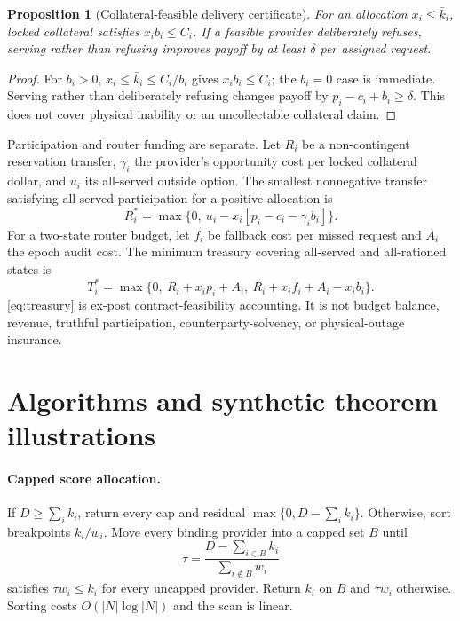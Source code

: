 \documentclass[11pt]{article}
\newtheorem{proposition}{Proposition}
\theoremstyle{definition}
\begin{document}
\begin{proposition}[Collateral-feasible delivery certificate]
\label{prop:collateral}
For an allocation $x_i\leq\bar k_i$, locked collateral satisfies
$x_i b_i\leq C_i$. If a feasible provider deliberately refuses, serving rather
than refusing improves payoff by at least $\delta$ per assigned request.
\end{proposition}

\begin{proof}
For $b_i>0$, $x_i\leq\bar k_i\leq C_i/b_i$ gives $x_ib_i\leq C_i$; the
$b_i=0$ case is immediate. Serving rather than deliberately refusing changes
payoff by $p_i-c_i+b_i\geq\delta$. This does not cover physical inability or an
uncollectable collateral claim.
\end{proof}

Participation and router funding are separate. Let $R_i$ be a non-contingent
reservation transfer, $\gamma_i$ the provider's opportunity cost per locked
collateral dollar, and $u_i$ its all-served outside option. The smallest
nonnegative transfer satisfying all-served participation for a positive
allocation is
\[
 R_i^*=\max\{0,\ u_i-x_i[p_i-c_i-\gamma_i b_i]\}.
\]
For a two-state router budget, let $f_i$ be fallback cost per missed request
and $A_i$ the epoch audit cost. The minimum treasury covering all-served and
all-rationed states is
\begin{equation}
\label{eq:treasury}
 T_i^*=\max\{0,\ R_i+x_ip_i+A_i,\ R_i+x_if_i+A_i-x_ib_i\}.
\end{equation}
\cref{eq:treasury} is ex-post contract-feasibility accounting. It is not
budget balance, revenue, truthful participation, counterparty-solvency, or
physical-outage insurance.

\section{Algorithms and synthetic theorem illustrations}
\label{sec:algorithms}

\paragraph{Capped score allocation.}
If $D\geq\sum_i k_i$, return every cap and residual
$\max\{0,D-\sum_i k_i\}$. Otherwise, sort breakpoints $k_i/w_i$. Move every
binding provider into a capped set $B$ until
\[
 \tau=\frac{D-\sum_{i\in B}k_i}{\sum_{i\notin B}w_i}
\]
satisfies $\tau w_i\leq k_i$ for every uncapped provider. Return $k_i$ on
$B$ and $\tau w_i$ otherwise. Sorting costs $O(|N|\log |N|)$ and the scan is
linear.
\end{document}
